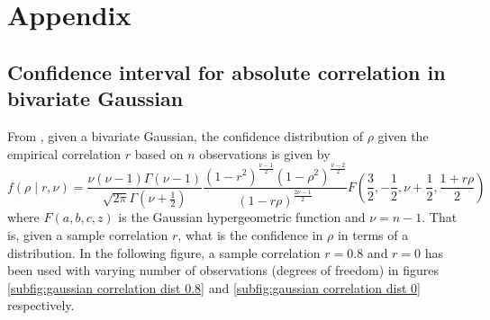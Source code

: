 \documentclass[../Thesis.tex]{subfiles}
\begin{document}
\chapter{Appendix}

\section{Confidence interval for absolute correlation in bivariate Gaussian}\label{sec:bivar gauss abs correlation CI}
From \cite{Confidence-in-Correlation}, given a bivariate Gaussian, the confidence distribution of $\rho$ given the empirical correlation $r$ based on $n$ observations is given by
$$f\left(\rho \mid r,\nu\right) = \frac{\nu (\nu-1) \Gamma(\nu-1)}{\sqrt{2\pi} \Gamma(\nu + \frac{1}{2})} \frac{\left(1-r^2\right)^{\frac{\nu-1}{2}} \left(1-\rho^2\right)^{\frac{\nu-2}{2}} }{\left(1-r\rho\right)^{\frac{2\nu-1}{2}}} F\left(\frac{3}{2}, -\frac{1}{2}, \nu+\frac{1}{2}, \frac{1+r\rho}{2}\right)$$
where $F\left(a,b,c,z\right)$ is the Gaussian hypergeometric function and $\nu = n-1$. That is, given a sample correlation $r$, what is the confidence in $\rho$ in terms of a distribution. In the following figure, a sample correlation $r=0.8$ and $r=0$ has been used with varying number of observations (degrees of freedom) in figures \autoref{subfig:gaussian correlation dist 0.8} and \autoref{subfig:gaussian correlation dist 0} respectively.
\end{document}
